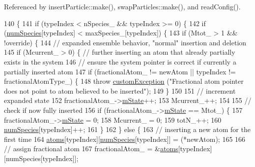 Referenced by insert\-Particle\-::make(), swap\-Particles\-::make(), and read\-Config().


\begin{DoxyCode}
140                                                                              \{
141     \textcolor{keywordflow}{if} (typeIndex < nSpecies\_ && typeIndex >= 0) \{
142         \textcolor{keywordflow}{if} (\hyperlink{classsim_system_a9eea865e6dc1cff377b1e79c4d9c23f0}{numSpecies}[typeIndex] < maxSpecies\_[typeIndex]) \{
143             \textcolor{keywordflow}{if} (Mtot\_ > 1 && !\textcolor{keyword}{override}) \{
144                 \textcolor{comment}{// expanded ensemble behavior, "normal" insertion and deletion}
145                 \textcolor{keywordflow}{if} (Mcurrent\_ > 0) \{ \textcolor{comment}{// further inserting an atom that already partially exists in the
       system}
146                     \textcolor{comment}{// ensure the system pointer is correct if currently a partially inserted atom}
147                     \textcolor{keywordflow}{if} (fractionalAtom\_ != newAtom || typeIndex != fractionalAtomType\_) \{
148                         \textcolor{keywordflow}{throw} \hyperlink{classcustom_exception}{customException} (\textcolor{stringliteral}{"Fractional atom pointer does not point to
       atom believed to be inserted"});
149                     \}
150 
151                     \textcolor{comment}{// increment expanded state}
152                     fractionalAtom\_->\hyperlink{classatom_a3cb00c0c5b7533657e05af6ff4a42740}{mState}++;
153                     Mcurrent\_++;
154 
155                     \textcolor{comment}{// check if now fully inserted}
156                     \textcolor{keywordflow}{if} (fractionalAtom\_->\hyperlink{classatom_a3cb00c0c5b7533657e05af6ff4a42740}{mState} == Mtot\_) \{
157                         fractionalAtom\_->\hyperlink{classatom_a3cb00c0c5b7533657e05af6ff4a42740}{mState} = 0;
158                         Mcurrent\_ = 0;
159                         totN\_++;
160                         \hyperlink{classsim_system_a9eea865e6dc1cff377b1e79c4d9c23f0}{numSpecies}[typeIndex]++;
161                     \}
162                 \} \textcolor{keywordflow}{else} \{
163                     \textcolor{comment}{// inserting a new atom for the first time}
164                     \hyperlink{classsim_system_a90421b19082f7fb8fc23b7264b1161e4}{atoms}[typeIndex][\hyperlink{classsim_system_a9eea865e6dc1cff377b1e79c4d9c23f0}{numSpecies}[typeIndex]] = (*newAtom);
165 
166                     \textcolor{comment}{// assign fractional atom}
167                     fractionalAtom\_ = &\hyperlink{classsim_system_a90421b19082f7fb8fc23b7264b1161e4}{atoms}[typeIndex][numSpecies[typeIndex]];

\end{DoxyCode}
